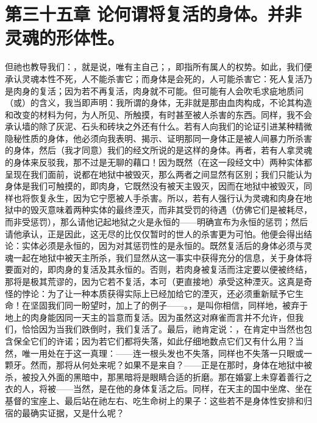 
\section{第三十五章 论何谓将复活的身体。并非灵魂的形体性。}

但祂也教导我们：，就是说，唯有主自己；，即指所有属人的权势。如此，我们便承认灵魂本性不死，人不能杀害它；而身体是会死的，人可能杀害它：死人复活乃是肉身的复活；因为若不再复活，肉身就不可能。但可能有人会吹毛求疵地质问（或）的含义，我当即声明：我所谓的身体，无非就是那由血肉构成，不论其构造和改变的材料为何，为人所见、所触摸，有时甚至被人杀害的东西。同样，我不会承认墙的除了灰泥、石头和砖块之外还有什么。若有人向我们的论证引进某种精微隐秘性质的身体，他必须向我表明、揭示、证明那同一身体正是被人间暴力所杀害的身体，然后（我才同意）我们的经文所说的是这样的身体。再者，若有人拿灵魂的身体来反驳我，那不过是无聊的藉口！因为既然（在这一段经文中）两种实体都呈现在我们面前，说都在地狱中被毁灭，那么两者之间显然有区别；我们只能认为身体是我们可触摸的，即肉身，它既然没有被天主毁灭，因而在地狱中被毁灭，同样也将恢复永生，因为它宁愿被人手杀害。所以，若有人强行认为灵魂和肉身在地狱中的毁灭意味着两种实体的最终湮灭，而非其受罚的待遇（仿佛它们是被耗尽，而非受惩罚），那么请他记起地狱之火是永恒的——明确宣布为永恒的惩罚；然后请他承认，正是因此，这无尽的比仅仅暂时的世人的杀害更为可怕。他便会得出结论：实体必须是永恒的，因为对其惩罚性的是永恒的。既然复活后的身体必须与灵魂一起在地狱中被天主所杀，我们显然从这一事实中获得充分的信息，关于身体将要面对的，即肉身的复活及其永恒的。否则，若肉身被复活而注定要以便被终结，那将是极其荒谬的，因为它若不复活，本可（更直接地）承受这种湮灭。这真是奇怪的悖论：为了让一种本质获得实际上已经加给它的湮灭，还必须重新赋予它生命！在坚固我们同一盼望时，加上了的例子——。，是叫你相信，同样地，被弃于地上的肉身能因同一天主的旨意而复活。因为虽然这对麻雀而言并不允许，但我们，恰恰因为当我们跌倒时，我们复活了。最后，祂肯定说：，在肯定中当然也包含保全它们的许诺；因为若它们都将失落，如此仔细地数点它们又有什么用？当然，唯一用处在于这一真理：——连一根头发也不失落，同样也不失落一只眼或一颗牙。然而，那将从何处来呢？如果不是来自？——正是在那时，身体在地狱中被杀，被投入外面的黑暗中，那黑暗将是眼睛合适的折磨。那在婚宴上未穿着善行之衣的人，将被——当然，是在他的身体复活之后。同样，在天主的国中坐席、坐在基督的宝座上、最后站在祂左右、吃生命树上的果子：这些若不是身体性安排和归宿的最确实证据，又是什么呢？\par

